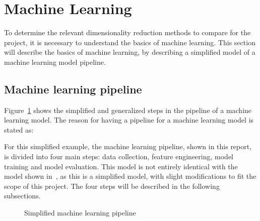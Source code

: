 
\section{Machine Learning}\label{sec:theory-machine-learning}
To determine the relevant dimensionality reduction methods to compare for the project, it is necessary to understand the basics of machine learning. This section will describe the basics of machine learning, by describing a simplified model of a machine learning model pipeline.


\subsection{Machine learning pipeline}\label{subsec:machine-learning-pipeline}
Figure~\ref{fig:machine-learning-pipeline} shows the simplified and generalized steps in the pipeline of a machine learning model. The reason for having a pipeline for a machine learning model is stated as:


For this simplified example, the machine learning pipeline, shown in this report, is divided into four main steps: data collection, feature engineering, model training and model evaluation. This model is not entirely identical with the model shown in~\cite{machine-learning-pipeline-architecture}, as this is a simplified model, with slight modifications to fit the scope of this project. The four steps will be described in the following subsections.


\begin{figure}[htb!]
    \centering
    \caption{Simplified machine learning pipeline}
    \label{fig:machine-learning-pipeline}
\end{figure}


